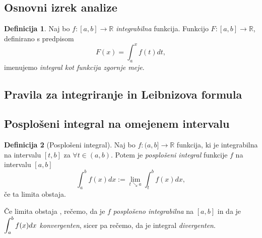 \documentclass[11pt]{article}
\theoremstyle{definition}
\newtheorem{definicija}{Definicija}[section]
\theoremstyle{definition}
\theoremstyle{definition}
\theoremstyle{theorem}
\begin{document}

\subsection{Osnovni izrek analize}
\vspace{0.5cm}

\begin{definicija}

Naj bo $f:[a, b] \rightarrow \mathbb{R}$ \textit{integrabilna} funkcija. Funkcijo $F:[a, b] \rightarrow \mathbb{R}$, definirano s predpisom
$$F(x) = \int_{a}^{x} f(t) dt,$$
imenujemo \textit{integral kot funkcija zgornje meje}.

\end{definicija}
\vspace{0.5cm}


\subsection{Pravila za integriranje in Leibnizova formula}
\vspace{0.5cm}


\subsection{Posplošeni integral na omejenem intervalu}
\vspace{0.5cm}

\begin{definicija}[Posplošeni integral]

Naj bo $f:(a, b] \rightarrow \mathbb{R}$ funkcija, ki je integrabilna na intervalu $[t, b]$ za $\forall t \in (a, b)$. Potem je \textit{posplošeni integral} funkcije $f$ na intervalu $[a, b]$
$$\int_{a}^{b} f(x) dx := \lim_{t \searrow a} \int_{t}^{b} f(x) dx,$$
če ta limita obstaja.

Če limita obstaja , rečemo, da je $f$ \textit{posplošeno integrabilna} na $[a, b]$ in da je $\mathlarger{\int_{a}^{b} f(x) dx}$ \textit{konvergenten}, sicer pa rečemo, da je integral \textit{divergenten}.

\end{definicija}
\vspace{0.5cm}
\end{document}
